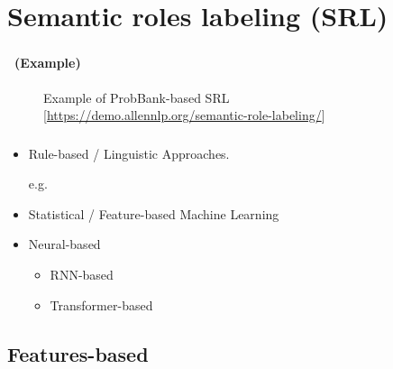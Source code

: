 \documentclass[xcolor=table]{beamer}
\begin{document}
\section{Semantic roles labeling (SRL)}

\begin{frame}
	\frametitle{\insertshortsubtitle}
	\framesubtitle{\insertsection\ (Example)}

	\begin{figure}
		\caption{Example of ProbBank-based SRL [\url{https://demo.allennlp.org/semantic-role-labeling/}]}
	\end{figure}
	
\end{frame}

\begin{frame}
	\frametitle{\insertshortsubtitle}
	\framesubtitle{\insertsection}
	
	\begin{itemize}
		\item Rule-based / Linguistic Approaches.
		
		e.g. 
		
		\item Statistical / Feature-based Machine Learning
		
		\item Neural-based
		\begin{itemize}
			\item RNN-based
			\item Transformer-based
		\end{itemize}
	\end{itemize}
	
\end{frame}

\subsection{Features-based}
\end{document}
